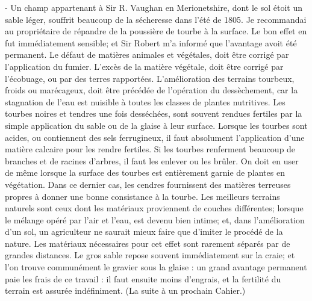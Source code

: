 - Un champ appartenant à Sir R. Vaughan\setcounter{page}{485} en Merionetshire, dont le sol étoit un sable léger, souffrit beaucoup de la sécheresse dans l'été de 1805. Je recommandai au propriétaire de répandre de la poussière de tourbe à la surface. Le bon effet en fut immédiatement sensible; et Sir Robert m'a informé que l'avantage avoit été permanent. Le défaut de matières animales et végétales, doit être corrigé par l'application du fumier. L'excès de la matière végétale, doit être corrigé par l'écobuage, ou par des terres rapportées. L'amélioration des terrains tourbeux, froids ou marécageux, doit être précédée de l'opération du dessèchement, car la stagnation de l'eau est nuisible à toutes les classes de plantes nutritives. Les tourbes noires et tendres une fois desséchées, sont souvent rendues fertiles par la simple application du sable ou de la glaise à leur surface. Lorsque les tourbes sont acides, ou contiennent des sels ferrugineux, il faut absolument l'application d'une matière calcaire pour les rendre fertiles. Si les tourbes renferment beaucoup de branches et de racines d'arbres, il faut les enlever ou les brûler. On doit en user de même lorsque la surface des tourbes est entièrement garnie de plantes en végétation. Dans ce dernier cas, les cendres fournissent\setcounter{page}{486} des matières terreuses propres à donner une bonne consistance à la tourbe.
Les meilleurs terrains naturels sont ceux dont les matériaux proviennent de couches différentes; lorsque le mélange opéré par l'air et l'eau, est devenu bien intime; et, dans l'amélioration d'un sol, un agriculteur ne saurait mieux faire que d'imiter le procédé de la nature.
Les matériaux nécessaires pour cet effet sont rarement séparés par de grandes distances. Le gros sable repose souvent immédiatement sur la craie; et l'on trouve communément le gravier sous la glaise : un grand avantage permanent paie les frais de ce travail : il faut ensuite moins d'engrais, et la fertilité du terrain est assurée indéfiniment.
(La suite à un prochain Cahier.)